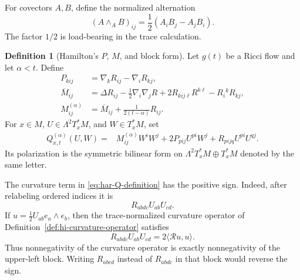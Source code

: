 \documentclass[10pt]{coll-l}
\theoremstyle{definition}
\newtheorem{definition}[theorem]{Definition}
\theoremstyle{remark}
\numberwithin{section}{chapter}
\numberwithin{equation}{chapter}
\begin{document}
For covectors $A,B$, define the normalized alternation
\begin{equation}
 (A\mathbin{\wedge_{\!A}}B)_{ij}
       =\frac12(A_iB_j-A_jB_i).                          \label{eq:har-normalized-wedge}
\end{equation}
The factor $1/2$ is load-bearing in the trace calculation.

\begin{definition}[Hamilton's $P$, $M$, and block form]
\label{def:har-block-form}
Let $g(t)$ be a Ricci flow and let $\alpha<t$.  Define
\begin{align}
 P_{kij}
   &=\nabla_kR_{ij}-\nabla_iR_{kj},                       \label{eq:har-P-definition}\\
 \overline M_{ij}
   &=\Delta R_{ij}-\frac12\nabla_i\nabla_jR
      +2R_{kij\ell}R^{k\ell}-R_i{}^kR_{kj},             \label{eq:har-Mbar-definition}\\
 M^{(\alpha)}_{ij}
   &=\overline M_{ij}+\frac1{2(t-\alpha)}R_{ij}.         \label{eq:har-M-definition}
\end{align}
For $x\in M$, $U\in\Lambda^2T_x^*M$, and $W\in T_x^*M$, set
\begin{equation}
 \begin{split}
 Q^{(\alpha)}_{x,t}(U,W)
   ={}&M^{(\alpha)}_{ij}W^iW^j
      +2P_{pij}U^{pi}W^j
      +R_{pijq}U^{pi}U^{qj}.                            \label{eq:har-Q-definition}
 \end{split}
\end{equation}
Its polarization is the symmetric bilinear form on
$\Lambda^2T_x^*M\oplus T_x^*M$ denoted by the same letter.
\end{definition}

The curvature term in \eqref{eq:har-Q-definition} has the positive sign.
Indeed, after relabeling ordered indices it is
\begin{equation}
                  R_{abdc}U_{ab}U_{cd}.                 \label{eq:har-positive-block}
\end{equation}
If $u=\frac12U_{ab}e_a\wedge e_b$, then the trace-normalized curvature
operator of Definition~\ref{def:hi-curvature-operator} satisfies
\begin{equation}
 R_{abdc}U_{ab}U_{cd}
       =2\langle\mathcal R u,u\rangle.                  \label{eq:har-operator-bridge}
\end{equation}
Thus nonnegativity of the curvature operator is exactly nonnegativity of
the upper-left block.  Writing $R_{abcd}$ instead of $R_{abdc}$ in that
block would reverse the sign.
\end{document}

